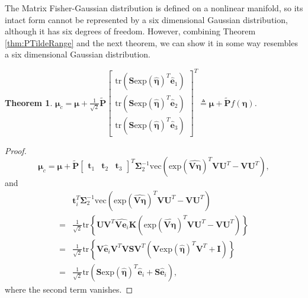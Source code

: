\documentclass[12pt]{article}
\newtheorem{theorem}{Theorem}
\begin{document}
The Matrix Fisher-Gaussian distribution is defined on a nonlinear manifold, so its intact form cannot be represented by a six dimensional Gaussian distribution, although it has six degrees of freedom.
However, combining Theorem \ref{thm:PTildeRange} and the next theorem, we can show it in some way resembles a six dimensional Gaussian distribution.
\begin{theorem} \label{thm:Miuc}
	$\bm{\mu}_c = \bm{\mu} + \frac{1}{\sqrt{2}}\tilde{\mathbf{P}}\begin{bmatrix}
		\mathrm{tr}\left(\mathbf{S}\mathrm{exp}(\hat{\bm{\eta}})^T\hat{\bm{e}}_1\right) \\
		\mathrm{tr}\left(\mathbf{S}\mathrm{exp}(\hat{\bm{\eta}})^T\hat{\bm{e}}_2\right) \\
		\mathrm{tr}\left(\mathbf{S}\mathrm{exp}(\hat{\bm{\eta}})^T\hat{\bm{e}}_3\right)
	\end{bmatrix}^T \triangleq \bm{\mu}+\tilde{\mathbf{P}}f(\bm{\eta})$.
\end{theorem}
\begin{proof}
	\begin{equation}
		\bm{\mu}_c = \bm{\mu} + \tilde{\mathbf{P}}\begin{bmatrix}
		\bm{t}_1 & \bm{t}_2 & \bm{t}_3
		\end{bmatrix}^T\mathbf{\Sigma}_2^{-1} \mathrm{vec}\left(\mathrm{exp}(\widehat{\mathbf{V}\bm{\eta}})^T\mathbf{V}\mathbf{U}^T-\mathbf{V}\mathbf{U}^T\right),
	\end{equation}
	and 
	\begin{equation}
		\begin{split}
			&\bm{t}_i^T\mathbf{\Sigma}_2^{-1}\mathrm{vec}\left(\mathrm{exp}(\widehat{\mathbf{V}\bm{\eta}})^T\mathbf{V}\mathbf{U}^T-\mathbf{V}\mathbf{U}^T\right) \\
			= &\frac{1}{\sqrt{2}}\mathrm{tr}\left\{\mathbf{U}\mathbf{V}^T\widehat{\mathbf{V}\bm{e}_i}\mathbf{K}\left(\mathrm{exp}(\widehat{\mathbf{V}\bm{\eta}})^T\mathbf{V}\mathbf{U}^T-\mathbf{V}\mathbf{U}^T\right)\right\} \\
			= &\frac{1}{\sqrt{2}}\mathrm{tr}\left\{\mathbf{V}\hat{\bm{e}}_i\mathbf{V}^T\mathbf{V}\mathbf{S}\mathbf{V}^T\left(\mathbf{V}\mathrm{exp}(\hat{\bm{\eta}})^T\mathbf{V}^T+\mathbf{I}\right)\right\} \\
			= &\frac{1}{\sqrt{2}}\mathrm{tr}\left(\mathbf{S}\mathrm{exp}(\hat{\bm{\eta}})^T\hat{\bm{e}}_i + \mathbf{S}\hat{\bm{e}}_i\right),
		\end{split}
	\end{equation}
	where the second term vanishes.
\end{proof}
\end{document}
